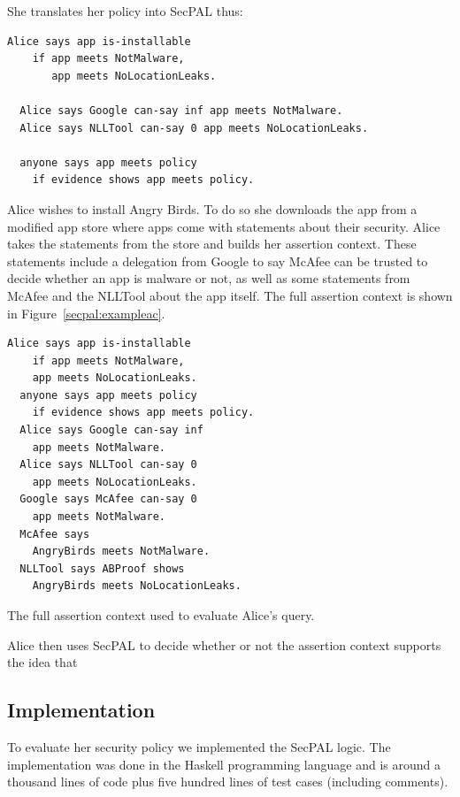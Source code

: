 \documentclass[a4paper,sfsidenotes]{tufte-book}
\begin{document}
She translates her policy into SecPAL thus:

\begin{lstlisting}[language=SecPAL]
  Alice says app is-installable 
    if app meets NotMalware, 
       app meets NoLocationLeaks.

  Alice says Google can-say inf app meets NotMalware.
  Alice says NLLTool can-say 0 app meets NoLocationLeaks.

  anyone says app meets policy
    if evidence shows app meets policy.
\end{lstlisting}

Alice wishes to install Angry Birds. To do so she downloads the app from a
modified app store where apps come with statements about their security.  Alice
takes the statements from the store and builds her assertion context.  These
statements include a delegation from Google to say McAfee can be trusted to
decide whether an app is malware or not, as well as some statements from McAfee
and the NLLTool about the app itself. The full assertion context is shown in
Figure~\ref{secpal:exampleac}.

\begin{marginfigure}\label{secpal:exampleac}
\begin{lstlisting}[language=SecPAL]
  Alice says app is-installable 
    if app meets NotMalware, 
    app meets NoLocationLeaks.
  anyone says app meets policy 
    if evidence shows app meets policy.
  Alice says Google can-say inf 
    app meets NotMalware.
  Alice says NLLTool can-say 0 
    app meets NoLocationLeaks.
  Google says McAfee can-say 0 
    app meets NotMalware.
  McAfee says 
    AngryBirds meets NotMalware.
  NLLTool says ABProof shows 
    AngryBirds meets NoLocationLeaks.
\end{lstlisting}
\caption{The full assertion context used to evaluate Alice's query.}
\end{marginfigure}

Alice then uses SecPAL to decide whether or not the assertion context supports
the idea that 

\subsection{Implementation}

To evaluate her security policy we implemented the SecPAL logic.
The implementation was done in the Haskell programming language and is around a
thousand lines of code plus five hundred lines of test cases (including
comments).
\end{document}
